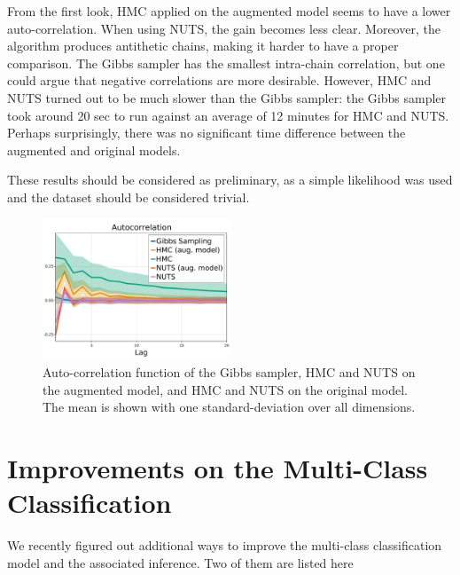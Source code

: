 From the first look, \ac{HMC} applied on the augmented model seems to have a lower auto-correlation.
When using \ac{NUTS}, the gain becomes less clear.
Moreover, the algorithm produces antithetic chains, making it harder to have a proper comparison.
The Gibbs sampler has the smallest intra-chain correlation, but one could argue that negative correlations are more desirable.
However, \ac{HMC} and \ac{NUTS} turned out to be much slower than the Gibbs sampler:
the Gibbs sampler took around 20 sec to run against an average of 12 minutes for \ac{HMC} and \ac{NUTS}.
Perhaps surprisingly, there was no significant time difference between the augmented and original models.

These results should be considered as preliminary, as a simple likelihood was used and the dataset should be considered trivial.

\begin{figure}
    \centering
    \includegraphics[width=0.5\textwidth]{./chapters/8_discussions/figures/autocorrelation.pdf}
    \caption{Auto-correlation function of the Gibbs sampler, \ac{HMC} and \ac{NUTS} on the augmented model, and \ac{HMC} and \ac{NUTS} on the original model.
    The mean is shown with one standard-deviation over all dimensions.}
    \label{fig:hmc_vs_gibbs}
\end{figure}


\section{Improvements on the Multi-Class Classification}
\label{sec:improvemulticlass}
We recently figured out additional ways to improve the multi-class classification model and the associated inference.
Two of them are listed here


